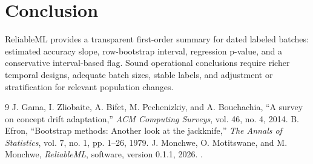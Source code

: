 \documentclass[conference]{IEEEtran}
\begin{document}
\section{Conclusion}
ReliableML provides a transparent first-order summary for dated labeled batches: estimated accuracy slope, row-bootstrap interval, regression p-value, and a conservative interval-based flag. Sound operational conclusions require richer temporal designs, adequate batch sizes, stable labels, and adjustment or stratification for relevant population changes.

\begin{thebibliography}{9}
 J. Gama, I. Zliobaite, A. Bifet, M. Pechenizkiy, and A. Bouchachia, ``A survey on concept drift adaptation,'' \emph{ACM Computing Surveys}, vol. 46, no. 4, 2014.
 B. Efron, ``Bootstrap methods: Another look at the jackknife,'' \emph{The Annals of Statistics}, vol. 7, no. 1, pp. 1--26, 1979.
 J. Monchwe, O. Motitswane, and M. Monchwe, \emph{ReliableML}, software, version 0.1.1, 2026. \projecturl.
\end{thebibliography}
\end{document}
